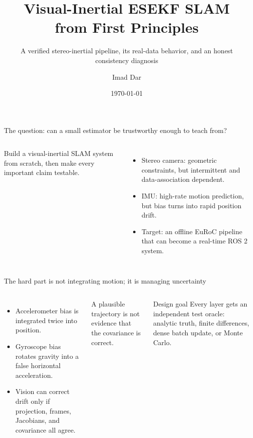 \documentclass[10pt,aspectratio=169]{beamer}
\title[Visual-Inertial ESEKF SLAM]{Visual-Inertial ESEKF SLAM\\from First Principles}
\subtitle{A verified stereo-inertial pipeline, its real-data behavior, and an honest consistency diagnosis}
\author{Imad Dar}
\institute{Technical deep dive}
\date{\today}
\begin{document}
\begin{frame}
  \titlepage
\end{frame}

\begin{frame}{The question: can a small estimator be trustworthy enough to teach from?}
  \begin{columns}[T]
    \Large Build a visual-inertial SLAM system from scratch, then make every important claim testable.
    \vspace{0.7em}
    \normalsize
    \begin{itemize}
      \item Stereo camera: geometric constraints, but intermittent and data-association dependent.
      \item IMU: high-rate motion prediction, but bias turns into rapid position drift.
      \item Target: an offline EuRoC pipeline that can become a real-time ROS 2 system.
    \end{itemize}
  \end{columns}
\end{frame}

\begin{frame}{The hard part is not integrating motion; it is managing uncertainty}
  \begin{columns}[T]
    \begin{itemize}
      \item Accelerometer bias is integrated twice into position.
      \item Gyroscope bias rotates gravity into a false horizontal acceleration.
      \item Vision can correct drift only if projection, frames, Jacobians, and covariance all agree.
    \end{itemize}
    \vspace{0.5em}
    \alert{A plausible trajectory is not evidence that the covariance is correct.}
    \begin{block}{Design goal}
      Every layer gets an independent test oracle: analytic truth, finite differences, dense batch update, or Monte Carlo.
    \end{block}
  \end{columns}
\end{frame}
\end{document}
